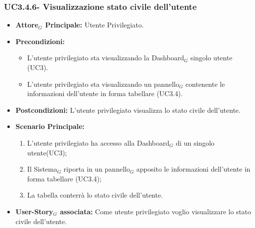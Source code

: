 \documentclass[10pt]{article}
\begin{document}
\begin{justify}
\subsubsection{\textbf{UC3.4.6- Visualizzazione stato civile dell'utente}}
\label{UC3.4.6}
\begin{itemize}
     \item \textbf{Attore$_G$ Principale:} Utente Privilegiato.
     \item \textbf{Precondizioni:}
        \begin{itemize}
    	\item L'utente privilegiato sta visualizzando la Dashboard$_G$ singolo utente (UC3).
          \item L'utente privilegiato sta visualizzando un pannello$_G$ contenente le informazioni dell'utente in forma tabellare (UC3.4).
        \end{itemize}
      \item \textbf{Postcondizioni:} L'utente privilegiato visualizza lo stato civile dell'utente. 
      \item \textbf{Scenario Principale:}
        \begin{enumerate}
            \item L'utente privilegiato ha accesso alla Dashboard$_G$ di un singolo utente(UC3);
            \item Il Sistema$_G$ riporta  in un pannello$_G$ apposito le informazioni dell'utente in forma tabellare (UC3.4);
            \item La tabella conterrà lo stato civile dell'utente.
        \end{enumerate}
     \item \textbf{User-Story$_G$ associata:}
       Come utente privilegiato voglio visualizzare lo stato civile dell'utente.
\end{itemize}


\end{justify}
\end{document}
